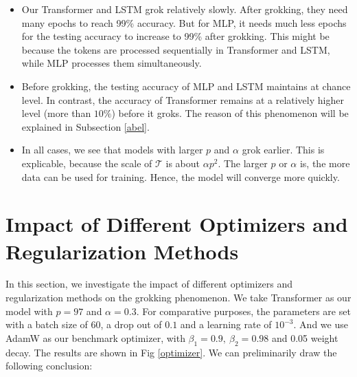 \documentclass{article}
\begin{document}
\begin{itemize}
    \item Our Transformer and LSTM grok relatively slowly. After grokking, they need many epochs to reach 99\% accuracy. But for MLP, it needs much less epochs for the testing accuracy to increase to 99\% after grokking. This might be because the tokens are processed sequentially in Transformer and LSTM, while MLP processes them simultaneously.

    \item Before grokking, the testing accuracy of MLP and LSTM maintains at chance level. In contrast, the accuracy of Transformer remains at a relatively higher level (more than $10\%$) before it groks. The reason of this phenomenon will be explained in Subsection \ref{abel}.

    \item In all cases, we see that models with larger $p$ and $\alpha$ grok earlier. This is explicable, because the scale of $\mathcal{T}$ is about $\alpha p^2$. The larger $p$ or $\alpha$ is, the more data can be used for training. Hence, the model will converge more quickly.
\end{itemize}

\section{Impact of Different Optimizers and Regularization Methods}

In this section, we investigate the impact of different optimizers and regularization methods on the grokking phenomenon. We take Transformer as our model with $p = 97$ and $\alpha = 0.3$. For comparative purposes, the parameters are set with a batch size of $60$, a drop out of $0.1$ and a learning rate of $10^{-3}$. And we use AdamW as our benchmark optimizer, with $\beta_1 = 0.9,\ \beta_2 = 0.98$ and 0.05 weight decay. The results are shown in Fig \ref{optimizer}. We can preliminarily draw the following conclusion:
\end{document}
